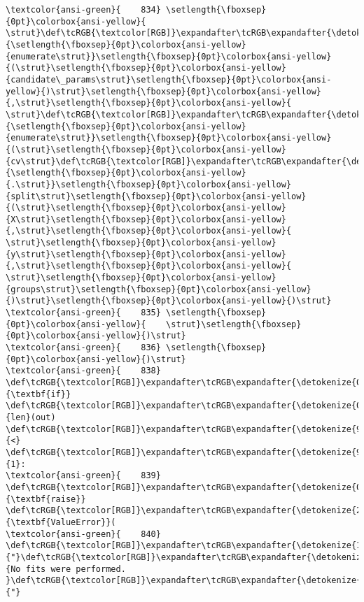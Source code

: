 \documentclass[11pt]{article}
\begin{document}
\begin{Verbatim}[commandchars=\\\{\}, frame=single, framerule=2mm, rulecolor=\color{outerrorbackground}]
\textcolor{ansi-green}{    834} \setlength{\fboxsep}{0pt}\colorbox{ansi-yellow}{        \strut}\def\tcRGB{\textcolor[RGB]}\expandafter\tcRGB\expandafter{\detokenize{0,135,0}}{\setlength{\fboxsep}{0pt}\colorbox{ansi-yellow}{enumerate\strut}}\setlength{\fboxsep}{0pt}\colorbox{ansi-yellow}{(\strut}\setlength{\fboxsep}{0pt}\colorbox{ansi-yellow}{candidate\_params\strut}\setlength{\fboxsep}{0pt}\colorbox{ansi-yellow}{)\strut}\setlength{\fboxsep}{0pt}\colorbox{ansi-yellow}{,\strut}\setlength{\fboxsep}{0pt}\colorbox{ansi-yellow}{ \strut}\def\tcRGB{\textcolor[RGB]}\expandafter\tcRGB\expandafter{\detokenize{0,135,0}}{\setlength{\fboxsep}{0pt}\colorbox{ansi-yellow}{enumerate\strut}}\setlength{\fboxsep}{0pt}\colorbox{ansi-yellow}{(\strut}\setlength{\fboxsep}{0pt}\colorbox{ansi-yellow}{cv\strut}\def\tcRGB{\textcolor[RGB]}\expandafter\tcRGB\expandafter{\detokenize{98,98,98}}{\setlength{\fboxsep}{0pt}\colorbox{ansi-yellow}{.\strut}}\setlength{\fboxsep}{0pt}\colorbox{ansi-yellow}{split\strut}\setlength{\fboxsep}{0pt}\colorbox{ansi-yellow}{(\strut}\setlength{\fboxsep}{0pt}\colorbox{ansi-yellow}{X\strut}\setlength{\fboxsep}{0pt}\colorbox{ansi-yellow}{,\strut}\setlength{\fboxsep}{0pt}\colorbox{ansi-yellow}{ \strut}\setlength{\fboxsep}{0pt}\colorbox{ansi-yellow}{y\strut}\setlength{\fboxsep}{0pt}\colorbox{ansi-yellow}{,\strut}\setlength{\fboxsep}{0pt}\colorbox{ansi-yellow}{ \strut}\setlength{\fboxsep}{0pt}\colorbox{ansi-yellow}{groups\strut}\setlength{\fboxsep}{0pt}\colorbox{ansi-yellow}{)\strut}\setlength{\fboxsep}{0pt}\colorbox{ansi-yellow}{)\strut}
\textcolor{ansi-green}{    835} \setlength{\fboxsep}{0pt}\colorbox{ansi-yellow}{    \strut}\setlength{\fboxsep}{0pt}\colorbox{ansi-yellow}{)\strut}
\textcolor{ansi-green}{    836} \setlength{\fboxsep}{0pt}\colorbox{ansi-yellow}{)\strut}
\textcolor{ansi-green}{    838} \def\tcRGB{\textcolor[RGB]}\expandafter\tcRGB\expandafter{\detokenize{0,135,0}}{\textbf{if}} \def\tcRGB{\textcolor[RGB]}\expandafter\tcRGB\expandafter{\detokenize{0,135,0}}{len}(out) \def\tcRGB{\textcolor[RGB]}\expandafter\tcRGB\expandafter{\detokenize{98,98,98}}{<} \def\tcRGB{\textcolor[RGB]}\expandafter\tcRGB\expandafter{\detokenize{98,98,98}}{1}:
\textcolor{ansi-green}{    839}     \def\tcRGB{\textcolor[RGB]}\expandafter\tcRGB\expandafter{\detokenize{0,135,0}}{\textbf{raise}} \def\tcRGB{\textcolor[RGB]}\expandafter\tcRGB\expandafter{\detokenize{215,95,95}}{\textbf{ValueError}}(
\textcolor{ansi-green}{    840}         \def\tcRGB{\textcolor[RGB]}\expandafter\tcRGB\expandafter{\detokenize{175,0,0}}{"}\def\tcRGB{\textcolor[RGB]}\expandafter\tcRGB\expandafter{\detokenize{175,0,0}}{No fits were performed. }\def\tcRGB{\textcolor[RGB]}\expandafter\tcRGB\expandafter{\detokenize{175,0,0}}{"}

\end{Verbatim}
\end{document}
